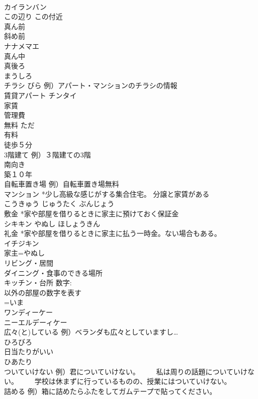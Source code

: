 \documentclass[8pt]{extreport}
\begin{document}
\begin{CJK}{UTF8}{min}
\\	カイランバン
\\	この辺り この付近	
\\	真ん前	
\\	斜め前	
\\	ナナメマエ 
\\	真ん中	
\\	真後ろ	
\\	まうしろ
\\	チラシ びら 例）アパート・マンションのチラシの情報	
\\	賃貸アパート	チンタイ 
\\	家賃	
\\	管理費	
\\	無料 ただ 
\\	有料	
\\	徒歩５分	
\\	3階建て 例）３階建ての3階	
\\	南向き	
\\	築１０年	
\\	自転車置き場 例）自転車置き場無料	
\\	マンション *少し高級な感じがする集合住宅。 分譲と家賃がある	
\\	こうきゅう じゅうたく ぶんじょう
\\	敷金 *家や部屋を借りるときに家主に預けておく保証金	
\\	シキキン やぬし ほしょうきん
\\	礼金 *家や部屋を借りるときに家主に払う一時金。ない場合もある。	
\\	イチジキン 
\\	家主=やぬし
\\	リビング・居間 
\\	ダイニング・食事のできる場所 
\\	キッチン・台所 数字:　
\\	以外の部屋の数字を表す	
\\	=いま 
\\	ワンディーケー 
\\	ニーエルデーィケー
\\	広々(と)している 例）ベランダも広々としていますし…	
\\	ひろびろ
\\	日当たりがいい	
\\	ひあたり
\\	ついていけない 例）君についていけない。 　　私は周りの話題についていけない。 　　学校は休まずに行っているものの、授業にはついていけない。	
\\	詰める 例）箱に詰めたらふたをしてガムテープで貼ってください。	

\end{CJK}
\end{document}
